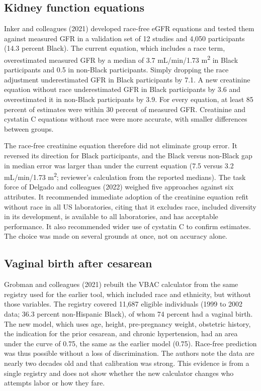 \documentclass[12pt]{article}
\begin{document}
\subsection*{Kidney function equations}
Inker and colleagues (2021) developed race-free eGFR equations and tested them against measured GFR in a validation set of 12 studies and 4,050 participants (14.3 percent Black). The current equation, which includes a race term, overestimated measured GFR by a median of 3.7 mL/min/1.73 m\textsuperscript{2} in Black participants and 0.5 in non-Black participants. Simply dropping the race adjustment underestimated GFR in Black participants by 7.1. A new creatinine equation without race underestimated GFR in Black participants by 3.6 and overestimated it in non-Black participants by 3.9. For every equation, at least 85 percent of estimates were within 30 percent of measured GFR. Creatinine and cystatin C equations without race were more accurate, with smaller differences between groups.

The race-free creatinine equation therefore did not eliminate group error. It reversed its direction for Black participants, and the Black versus non-Black gap in median error was larger than under the current equation (7.5 versus 3.2 mL/min/1.73 m\textsuperscript{2}; reviewer's calculation from the reported medians). The task force of Delgado and colleagues (2022) weighed five approaches against six attributes. It recommended immediate adoption of the creatinine equation refit without race in all US laboratories, citing that it excludes race, included diversity in its development, is available to all laboratories, and has acceptable performance. It also recommended wider use of cystatin C to confirm estimates. The choice was made on several grounds at once, not on accuracy alone.

\subsection*{Vaginal birth after cesarean}
Grobman and colleagues (2021) rebuilt the VBAC calculator from the same registry used for the earlier tool, which included race and ethnicity, but without those variables. The registry covered 11,687 eligible individuals (1999 to 2002 data; 36.3 percent non-Hispanic Black), of whom 74 percent had a vaginal birth. The new model, which uses age, height, pre-pregnancy weight, obstetric history, the indication for the prior cesarean, and chronic hypertension, had an area under the curve of 0.75, the same as the earlier model (0.75). Race-free prediction was thus possible without a loss of discrimination. The authors note the data are nearly two decades old and that calibration was strong. This evidence is from a single registry and does not show whether the new calculator changes who attempts labor or how they fare.
\end{document}
